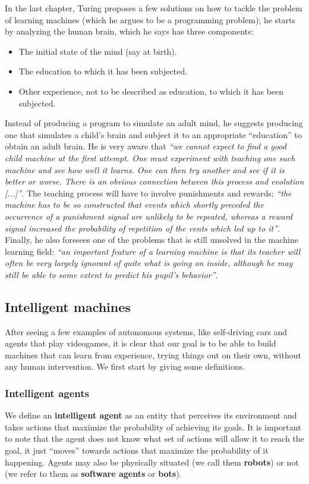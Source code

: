 \par
In the last chapter, Turing proposes a few solutions on how to tackle the problem of learning machines (which he argues to be a programming problem); he starts by analyzing the human brain, which he says has three components:
\begin{itemize}
    \item The initial state of the mind (say at birth).
    \item The education to which it has been subjected.
    \item Other experience, not to be described as education, to which it has been subjected.
\end{itemize}
Instead of producing a program to simulate an adult mind, he suggests producing one that simulates a child's brain and subject it to an appropriate ``education'' to obtain an adult brain. He is very aware that \textit{``we cannot expect to find a good child machine at the first attempt. One must experiment with teaching one such machine and see how well it learns. One can then try another and see if it is better or worse. There is an obvious connection between this process and evolution [...]''}. The teaching process will have to involve punishments and rewards: \textit{``the machine has to be so constructed that events which shortly preceded the occurrence of a punishment signal are unlikely to be repeated, whereas a reward signal increased the probability of repetition of the vents which led up to it''}. Finally, he also foresees one of the problems that is still unsolved in the machine learning field: \textit{``an important feature of a learning machine is that its teacher will often be very largely ignorant of quite what is going on inside, although he may still be able to some extent to predict his pupil's behavior''}.

\subsection{Intelligent machines}
After seeing a few examples of autonomous systems, like self-driving cars and agents that play videogames, it is clear that our goal is to be able to build machines that can learn from experience, trying things out on their own, without any human intervention. We first start by giving some definitions.

\subsubsection{Intelligent agents}
We define an \textbf{intelligent agent} as an entity that perceives its environment and takes actions that maximize the probability of achieving its goals. It is important to note that the agent does not know what set of actions will allow it to reach the goal, it just ``moves'' towards actions that maximize the probability of it happening. Agents may also be physically situated (we call them \textbf{robots}) or not (we refer to them as \textbf{software agents} or \textbf{bots}).


